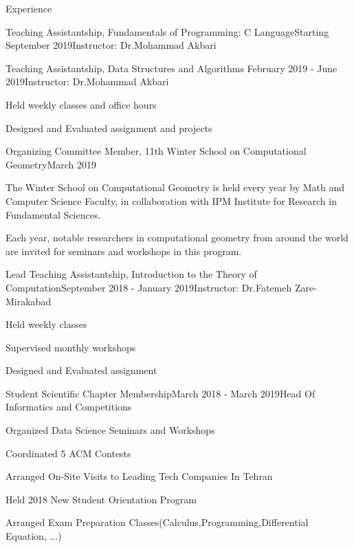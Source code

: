 \documentclass{resume} %
\begin{document}
	\begin{rSection}{Experience}
		\begin{rSubsection}{Teaching Assistantship, Fundamentals of Programming: C Language}{Starting September 2019}{Instructor: Dr.Mohammad Akbari}{ }

		\end{rSubsection}
	
		\begin{rSubsection}{Teaching Assistantship, Data Structures and Algorithms }{February 2019 - June 2019}{Instructor: Dr.Mohammad Akbari}{ }
			\item 
			Held weekly classes and office hours
			\item 
			Designed and Evaluated assignment and projects
		\end{rSubsection}
		\begin{rSubsection}{Organizing Committee Member, 11th Winter School on Computational Geometry}{March 2019}{}{ }
			\item 	The Winter School on Computational Geometry is held every year by Math and Computer Science Faculty, in collaboration with IPM Institute for Research in Fundamental Sciences.
			\item Each year, notable researchers in computational geometry from around the world are invited for seminars and workshops in this program.
		\end{rSubsection}
		
		
		
		\begin{rSubsection}{Lead Teaching Assistantship, Introduction to the Theory of Computation}{September 2018 - January 2019}{Instructor: Dr.Fatemeh Zare-Mirakabad}{ }
			\item Held weekly classes 
			\item Supervised monthly workshops
			\item Designed and Evaluated assignment 
			
		\end{rSubsection}
		
		
		\begin{rSubsection}{Student Scientific Chapter Membership}{March 2018 - March 2019}{Head Of Informatics and Competitions}{ }
			\item Organized Data Science Seminars and Workshops
			\item Coordinated 5 ACM Contests
			\item Arranged On-Site Visits to Leading Tech Companies In Tehran
			\item Held 2018 New Student Orientation Program 
			\item Arranged Exam Preparation Classes(Calculus,Programming,Differential Equation, ...)
		\end{rSubsection}
		
		
	\end{rSection}
	
\end{document}
